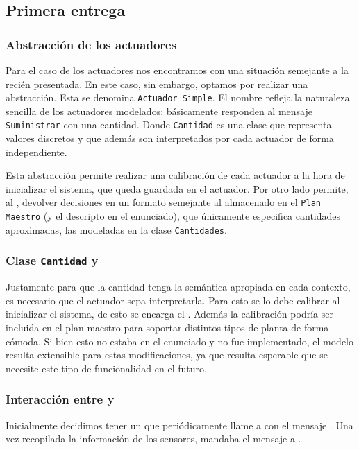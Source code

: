   \subsection{Primera entrega}

     \subsubsection{Abstracci\'on de los actuadores}
          Para el caso de los actuadores nos encontramos con una situaci\'on semejante
          a la reci\'en presentada. En este caso, sin embargo, optamos por realizar
          una abstracci\'on. Esta se denomina \texttt{Actuador Simple}. El nombre
          refleja la naturaleza sencilla de los actuadores modelados: b\'asicamente
          responden al mensaje \texttt{Suministrar} con una cantidad. Donde
          \texttt{Cantidad} es una clase que representa valores discretos y que adem\'as
          son interpretados por cada actuador de forma independiente.

          Esta abstracci\'on permite realizar una calibraci\'on de cada actuador a la
          hora de inicializar el sistema, que queda
          guardada en el actuador. Por otro lado permite, al \decisiones{},
          devolver decisiones en un formato semejante al almacenado en el
          \texttt{Plan Maestro} (y el descripto en el enunciado), que \'unicamente
          especifica cantidades aproximadas, las modeladas en la clase
          \texttt{Cantidades}.

      \subsubsection{Clase \texttt{Cantidad} y \calibrador{}}
          Justamente para que la cantidad tenga la sem\'antica apropiada en cada
          contexto, es necesario que el actuador sepa interpretarla.
          Para esto se lo debe calibrar al inicializar el sistema, de esto se
          encarga el \calibrador{}. Adem\'as la calibraci\'on podr\'ia ser incluida
          en el plan maestro para soportar distintos tipos de planta de forma
          c\'omoda. Si bien esto no estaba en el enunciado y no fue implementado,
          el modelo resulta extensible para estas modificaciones, ya que resulta
          esperable que se necesite este tipo de funcionalidad en el futuro.

      \subsubsection{Interacci\'on entre \decisiones{} y \condiciones{}}
          Inicialmente decidimos tener un \timer{} que peri\'odicamente llame a \condiciones{}
          con el mensaje \sensarCondiciones{}. Una vez recopilada la informaci\'on de los
          sensores, \condiciones{} mandaba el mensaje \tomarDecisiones{} a \decisiones{}.

